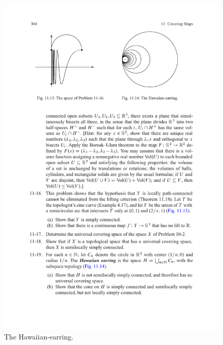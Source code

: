 \begin{figure}[htbp]
\begin{minipage}{200pt}
\includegraphics{Hawaiian-earring}
\caption{The Hawaiian-earring.}
\end{minipage}
\end{figure}
